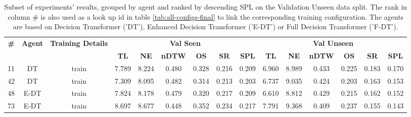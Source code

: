 \begin{table}
\centering
\caption{\label{tab:instruction_encoding}Subset of experiments' results, grouped by agent and ranked by descending SPL on the Validation Unseen data split. The rank in column \# is also used as a look up id in table \ref{tab:all-configs-final} to link the corresponding training configuration.     \newline The agents are based on Decision Transformer ('DT'), Enhanced Decision Transformer ('E-DT') or Full Decision Transformer ('F-DT').}
\begin{tabular}{@{\hskip3pt}c@{\hskip3pt}c@{\hskip3pt}c@{\hskip3pt}c@{\hskip3pt}c@{\hskip3pt}c@{\hskip3pt}c@{\hskip3pt}c@{\hskip3pt}c@{\hskip3pt}c@{\hskip3pt}c@{\hskip3pt}c@{\hskip3pt}c@{\hskip3pt}c@{\hskip3pt}c}
\toprule
\textbf{\#} & \textbf{Agent} & \textbf{Training Details} & \multicolumn{6}{c}{\textbf{Val Seen}} & \multicolumn{6}{c}{\textbf{Val Unseen}} \\
\cmidrule(l){4-9} \cmidrule(l){10-15} \textbf{~} &     \textbf{~} &                \textbf{~} &       \textbf{TL} & \textbf{NE} & \textbf{nDTW} & \textbf{OS} & \textbf{SR} & \textbf{SPL} &         \textbf{TL} & \textbf{NE} & \textbf{nDTW} & \textbf{OS} & \textbf{SR} & \textbf{SPL} \\
\midrule
         11 &             DT &                     train &             7.789 &       8.224 &         0.480 &       0.328 &       0.216 &        0.209 &               6.960 &       8.989 &         0.433 &       0.225 &       0.183 &        0.170 \\
         42 &             DT &                     train &             7.309 &       8.095 &         0.482 &       0.314 &       0.213 &        0.203 &               6.737 &       9.035 &         0.424 &       0.203 &       0.163 &        0.153 \\
         48 &           E-DT &                     train &             7.824 &       8.178 &         0.479 &       0.320 &       0.217 &        0.209 &               6.610 &       8.812 &         0.429 &       0.215 &       0.162 &        0.152 \\
         73 &           E-DT &                     train &             8.697 &       8.677 &         0.448 &       0.352 &       0.234 &        0.217 &               7.791 &       9.368 &         0.409 &       0.237 &       0.155 &        0.143 \\
\bottomrule
\end{tabular}
\end{table}
